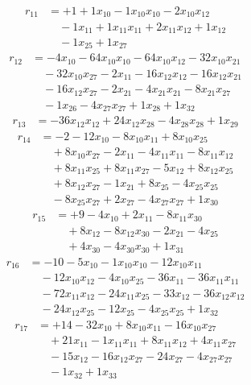 \[\begin{aligned}
r_{11} &= + 1 + 1 x_{10} - 1 x_{10} x_{10} - 2 x_{10} x_{12} \\
 &\quad - 1 x_{11} + 1 x_{11} x_{11} + 2 x_{11} x_{12} + 1 x_{12} \\
 &\quad - 1 x_{25} + 1 x_{27}
\end{aligned}\]
\[\begin{aligned}
r_{12} &= - 4 x_{10} - 64 x_{10} x_{10} - 64 x_{10} x_{12} - 32 x_{10} x_{21} \\
 &\quad - 32 x_{10} x_{27} - 2 x_{11} - 16 x_{12} x_{12} - 16 x_{12} x_{21} \\
 &\quad - 16 x_{12} x_{27} - 2 x_{21} - 4 x_{21} x_{21} - 8 x_{21} x_{27} \\
 &\quad - 1 x_{26} - 4 x_{27} x_{27} + 1 x_{28} + 1 x_{32}
\end{aligned}\]
\[\begin{aligned}
r_{13} &= - 36 x_{12} x_{12} + 24 x_{12} x_{28} - 4 x_{28} x_{28} + 1 x_{29}
\end{aligned}\]
\[\begin{aligned}
r_{14} &= - 2 - 12 x_{10} - 8 x_{10} x_{11} + 8 x_{10} x_{25} \\
 &\quad + 8 x_{10} x_{27} - 2 x_{11} - 4 x_{11} x_{11} - 8 x_{11} x_{12} \\
 &\quad + 8 x_{11} x_{25} + 8 x_{11} x_{27} - 5 x_{12} + 8 x_{12} x_{25} \\
 &\quad + 8 x_{12} x_{27} - 1 x_{21} + 8 x_{25} - 4 x_{25} x_{25} \\
 &\quad - 8 x_{25} x_{27} + 2 x_{27} - 4 x_{27} x_{27} + 1 x_{30}
\end{aligned}\]
\[\begin{aligned}
r_{15} &= + 9 - 4 x_{10} + 2 x_{11} - 8 x_{11} x_{30} \\
 &\quad + 8 x_{12} - 8 x_{12} x_{30} - 2 x_{21} - 4 x_{25} \\
 &\quad + 4 x_{30} - 4 x_{30} x_{30} + 1 x_{31}
\end{aligned}\]
\[\begin{aligned}
r_{16} &= - 10 - 5 x_{10} - 1 x_{10} x_{10} - 12 x_{10} x_{11} \\
 &\quad - 12 x_{10} x_{12} - 4 x_{10} x_{25} - 36 x_{11} - 36 x_{11} x_{11} \\
 &\quad - 72 x_{11} x_{12} - 24 x_{11} x_{25} - 33 x_{12} - 36 x_{12} x_{12} \\
 &\quad - 24 x_{12} x_{25} - 12 x_{25} - 4 x_{25} x_{25} + 1 x_{32}
\end{aligned}\]
\[\begin{aligned}
r_{17} &= + 14 - 32 x_{10} + 8 x_{10} x_{11} - 16 x_{10} x_{27} \\
 &\quad + 21 x_{11} - 1 x_{11} x_{11} + 8 x_{11} x_{12} + 4 x_{11} x_{27} \\
 &\quad - 15 x_{12} - 16 x_{12} x_{27} - 24 x_{27} - 4 x_{27} x_{27} \\
 &\quad - 1 x_{32} + 1 x_{33}
\end{aligned}\]
